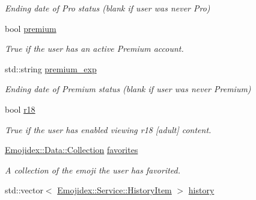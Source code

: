\begin{DoxyCompactItemize}
\begin{DoxyCompactList}\small\item\em Ending date of Pro status (blank if user was never Pro) \end{DoxyCompactList}\item 
bool \hyperlink{classEmojidex_1_1Service_1_1User_a7ca897df6f9b7a903a395494b58a1b12}{premium}\hypertarget{classEmojidex_1_1Service_1_1User_a7ca897df6f9b7a903a395494b58a1b12}{}\label{classEmojidex_1_1Service_1_1User_a7ca897df6f9b7a903a395494b58a1b12}

\begin{DoxyCompactList}\small\item\em True if the user has an active Premium account. \end{DoxyCompactList}\item 
std\+::string \hyperlink{classEmojidex_1_1Service_1_1User_a310c157d017007a8747cb3fa03c29e78}{premium\+\_\+exp}\hypertarget{classEmojidex_1_1Service_1_1User_a310c157d017007a8747cb3fa03c29e78}{}\label{classEmojidex_1_1Service_1_1User_a310c157d017007a8747cb3fa03c29e78}

\begin{DoxyCompactList}\small\item\em Ending date of Premium status (blank if user was never Premium) \end{DoxyCompactList}\item 
bool \hyperlink{classEmojidex_1_1Service_1_1User_a0a66ff7c784815a1e186749bdc032070}{r18}\hypertarget{classEmojidex_1_1Service_1_1User_a0a66ff7c784815a1e186749bdc032070}{}\label{classEmojidex_1_1Service_1_1User_a0a66ff7c784815a1e186749bdc032070}

\begin{DoxyCompactList}\small\item\em True if the user has enabled viewing r18 \mbox{[}adult\mbox{]} content. \end{DoxyCompactList}\item 
\hyperlink{classEmojidex_1_1Data_1_1Collection}{Emojidex\+::\+Data\+::\+Collection} \hyperlink{classEmojidex_1_1Service_1_1User_a7f4e37b223204146363b50ffdf89e12e}{favorites}\hypertarget{classEmojidex_1_1Service_1_1User_a7f4e37b223204146363b50ffdf89e12e}{}\label{classEmojidex_1_1Service_1_1User_a7f4e37b223204146363b50ffdf89e12e}

\begin{DoxyCompactList}\small\item\em A collection of the emoji the user has favorited. \end{DoxyCompactList}\item 
std\+::vector$<$ \hyperlink{classEmojidex_1_1Service_1_1HistoryItem}{Emojidex\+::\+Service\+::\+History\+Item} $>$ \hyperlink{classEmojidex_1_1Service_1_1User_af3cc2fec42e5e17f442f718e15f76847}{history}\hypertarget{classEmojidex_1_1Service_1_1User_af3cc2fec42e5e17f442f718e15f76847}{}\label{classEmojidex_1_1Service_1_1User_af3cc2fec42e5e17f442f718e15f76847}


\end{DoxyCompactItemize}
